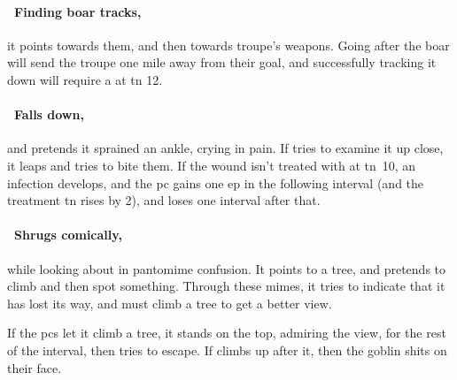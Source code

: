 \documentclass[10pt,twoside]{book}
\begin{document}

\boar

\paragraph{\Square~Finding boar tracks,}
it points towards them, and then towards troupe's \glspl{weapon}.
Going after the boar will send the troupe one mile away from their goal, and successfully tracking it down will require a  at \gls{tn} 12.

\paragraph{\Square~Falls down,}
and pretends it sprained an ankle, crying in pain.
If  tries to examine it up close, it leaps and tries to bite them.
If the wound isn't treated with  at \gls{tn}~10, an infection develops, and the \gls{pc} gains one \gls{ep} in the following \gls{interval} (and the treatment \gls{tn} rises by 2), and loses  one \gls{interval} after that.

\paragraph{\Square~Shrugs comically,}
while looking about in pantomime confusion.
It points to a tree, and pretends to climb and then spot something.
Through these mimes, it tries to indicate that it has lost its way, and must climb a tree to get a better view.

If the \glspl{pc} let it climb a tree, it stands on the top, admiring the view, for the rest of the \gls{interval}, then tries to escape.
If  climbs up after it, then the goblin shits on their face.
\end{document}
